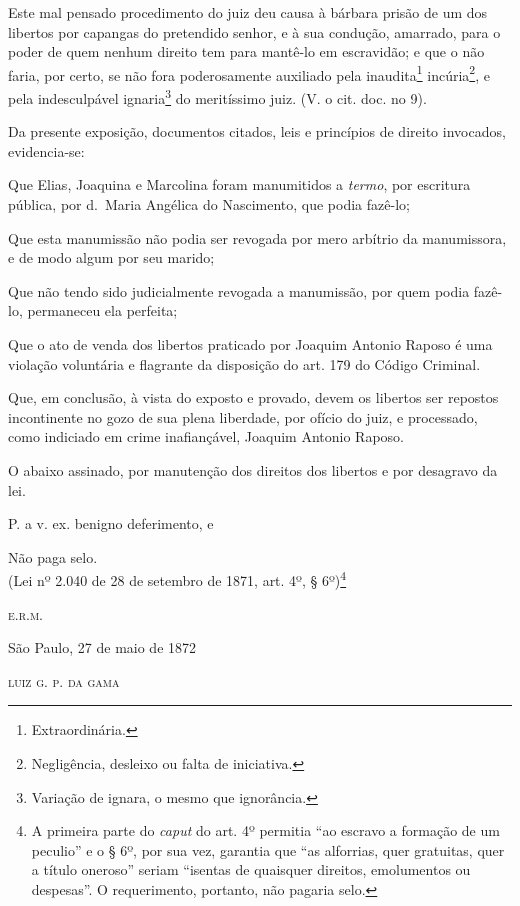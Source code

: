 {\begin{flushright}
Este mal pensado procedimento do juiz deu causa à bárbara prisão de um
dos libertos por capangas do pretendido senhor, e à sua condução,
amarrado, para o poder de quem nenhum direito tem para mantê-lo em
escravidão; e que o não faria, por certo, se não fora poderosamente
auxiliado pela inaudita\footnote{ Extraordinária.} incúria\footnote{
  Negligência, desleixo ou falta de iniciativa.}, e pela indesculpável
ignaria\footnote{ Variação de ignara, o mesmo que ignorância.} do
meritíssimo juiz. (V. o cit. doc. no 9).

Da presente exposição, documentos citados, leis e princípios de direito
invocados, evidencia-se:

Que Elias, Joaquina e Marcolina foram manumitidos a \emph{termo}, por
escritura pública, por d.~Maria Angélica do Nascimento, que podia
fazê-lo;

Que esta manumissão não podia ser revogada por mero arbítrio da
manumissora, e de modo algum por seu marido;

Que não tendo sido judicialmente revogada a manumissão, por quem podia
fazê-lo, permaneceu ela perfeita;

Que o ato de venda dos libertos praticado por Joaquim Antonio Raposo é
uma violação voluntária e flagrante da disposição do art. 179 do Código
Criminal.

Que, em conclusão, à vista do exposto e provado, devem os libertos ser
repostos incontinente no gozo de sua plena liberdade, por ofício do
juiz, e processado, como indiciado em crime inafiançável, Joaquim
Antonio Raposo.

O abaixo assinado, por manutenção dos direitos dos libertos e por
desagravo da lei.

P. a v. ex. benigno deferimento, e

Não paga selo.\\
(Lei nº 2.040 de 28 de setembro de 1871, art. 4º, § 6º)\footnote{ A
  primeira parte do \emph{caput} do art. 4º permitia ``ao escravo a
  formação de um peculio'' e o § 6º, por sua vez, garantia que ``as
  alforrias, quer gratuitas, quer a título oneroso'' seriam ``isentas de
  quaisquer direitos, emolumentos ou despesas''. O requerimento,
  portanto, não pagaria selo.}

\begin{flushright}
\textsc{e.r.m.}

São Paulo, 27 de maio de 1872

\textsc{luiz g. p. da gama}
\end{flushright}


\end{flushright}}
